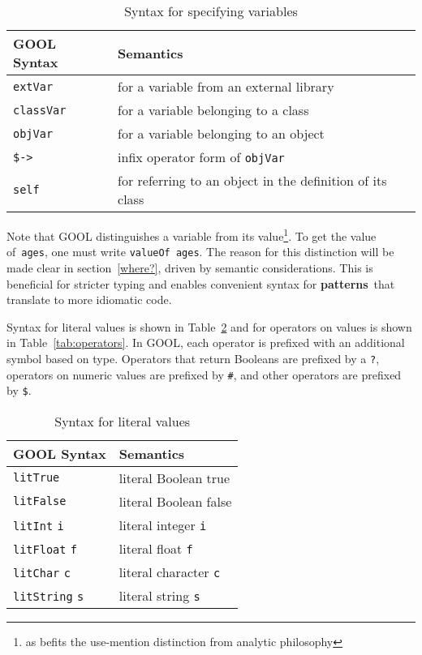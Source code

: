 \documentclass[sigplan,review,anonymous,prologue,dvipsnames]{acmart}
\newcommand{\abbrev}[1]{\textbf{#1}}
\newcommand{\oopatterns}{\abbrev{patterns}}
\begin{document}
\begin{table}[!h]
\caption{Syntax for specifying variables}
\begin{tabular}{p{} p{}}
  \textbf{GOOL Syntax} & \textbf{Semantics} \\
  \midrule
  \verb|extVar| & for a variable from an external library \\
  \verb|classVar| & for a variable belonging to a class \\
  \verb|objVar| & for a variable belonging to an object \\
  \verb|$->| & infix operator form of \verb|objVar| \\
  \verb|self| & for referring to an object in the definition of its class \\
\end{tabular}
\label{tab:variables}
\end{table}

Note that GOOL distinguishes a variable from its value\footnote{
as befits the use-mention distinction from analytic philosophy}. To get
the value of~\verb|ages|, one must write \verb|valueOf ages|. The reason for
this distinction will be made clear in section~\ref{where?}, driven
by semantic considerations. This is beneficial for stricter typing and
enables convenient syntax for \oopatterns~that translate to more idiomatic
code.

Syntax for literal values is shown in Table~\ref{tab:literals} and for
operators on values is shown in Table~\ref{tab:operators}. In GOOL, each
operator is prefixed with an additional symbol based on type. Operators that
return Booleans are prefixed by a \verb|?|, operators on numeric values are
prefixed by \verb|#|, and other operators are prefixed by \verb|$|.

\begin{table}[!h]
  \caption{Syntax for literal values}
  \begin{tabular}{p{} p{}}
    \textbf{GOOL Syntax} & \textbf{Semantics} \\
    \midrule
    \verb|litTrue| & literal Boolean true \\
    \verb|litFalse| & literal Boolean false \\
    \verb|litInt| \verb|i| & literal integer \verb|i| \\
    \verb|litFloat| \verb|f| & literal float \verb|f| \\
    \verb|litChar| \verb|c| & literal character \verb|c| \\
    \verb|litString| \verb|s| & literal string \verb|s| \\
  \end{tabular}
  \label{tab:literals}
\end{table}
\end{document}
